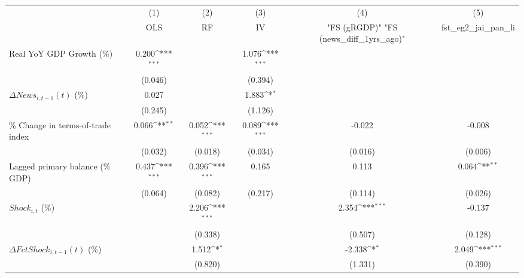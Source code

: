 {
\def\sym#1{\ifmmode^{#1}\else\(^{#1}\)\fi}
\begin{tabular}{l*{5}{c}}
\toprule
                    &\multicolumn{1}{c}{(1)}&\multicolumn{1}{c}{(2)}&\multicolumn{1}{c}{(3)}&\multicolumn{1}{c}{(4)}&\multicolumn{1}{c}{(5)}\\
                    &\multicolumn{1}{c}{OLS}&\multicolumn{1}{c}{RF}&\multicolumn{1}{c}{IV}&\multicolumn{1}{c}{ "FS (gRGDP)"  "FS (news_diff_1yrs_ago)" }&\multicolumn{1}{c}{fst_eg2_jai_pan_li}\\
\midrule
Real YoY GDP Growth (\%)&       0.200\sym{***}&                     &       1.076\sym{***}&                     &                     \\
                    &     (0.046)         &                     &     (0.394)         &                     &                     \\
\addlinespace
$ \Delta News_{i,t-1}(t)$ (\%)&       0.027         &                     &       1.883\sym{*}  &                     &                     \\
                    &     (0.245)         &                     &     (1.126)         &                     &                     \\
\addlinespace
\% Change in terms-of-trade index&       0.066\sym{**} &       0.052\sym{***}&       0.089\sym{***}&      -0.022         &      -0.008         \\
                    &     (0.032)         &     (0.018)         &     (0.034)         &     (0.016)         &     (0.006)         \\
\addlinespace
Lagged primary balance (\% GDP)&       0.437\sym{***}&       0.396\sym{***}&       0.165         &       0.113         &       0.064\sym{**} \\
                    &     (0.064)         &     (0.082)         &     (0.217)         &     (0.114)         &     (0.026)         \\
\addlinespace
$ Shock_{i,t}$ (\%) &                     &       2.206\sym{***}&                     &       2.354\sym{***}&      -0.137         \\
                    &                     &     (0.338)         &                     &     (0.507)         &     (0.128)         \\
\addlinespace
$ \Delta FctShock_{i,t-1}(t)$ (\%)&                     &       1.512\sym{*}  &                     &      -2.338\sym{*}  &       2.049\sym{***}\\
                    &                     &     (0.820)         &                     &     (1.331)         &     (0.390)         \\

\end{tabular}}

